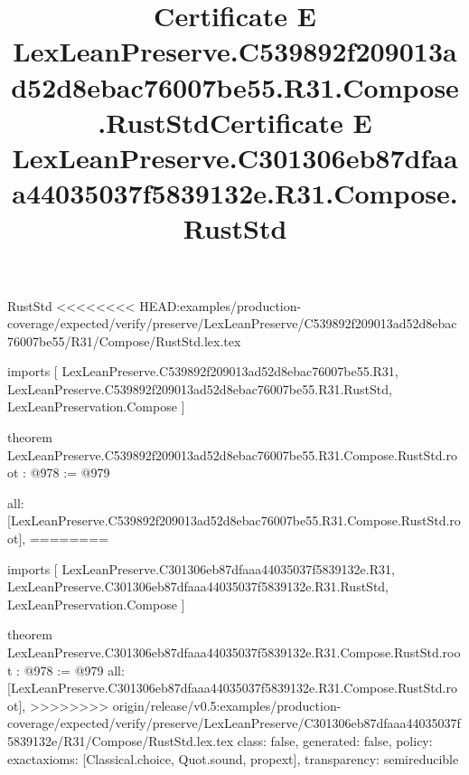 \begin{lexlean}{RustStd}
<<<<<<<< HEAD:examples/production-coverage/expected/verify/preserve/LexLeanPreserve/C539892f209013ad52d8ebac76007be55/R31/Compose/RustStd.lex.tex
\title{Certificate E LexLeanPreserve.C539892f209013ad52d8ebac76007be55.R31.Compose.RustStd}
\begin{coremodule}
imports [
  LexLeanPreserve.C539892f209013ad52d8ebac76007be55.R31,
  LexLeanPreserve.C539892f209013ad52d8ebac76007be55.R31.RustStd,
  LexLeanPreservation.Compose
]

theorem LexLeanPreserve.C539892f209013ad52d8ebac76007be55.R31.Compose.RustStd.root : @978 := @979 {
  all: [LexLeanPreserve.C539892f209013ad52d8ebac76007be55.R31.Compose.RustStd.root],
========
\title{Certificate E LexLeanPreserve.C301306eb87dfaaa44035037f5839132e.R31.Compose.RustStd}
\begin{coremodule}
imports [
  LexLeanPreserve.C301306eb87dfaaa44035037f5839132e.R31,
  LexLeanPreserve.C301306eb87dfaaa44035037f5839132e.R31.RustStd,
  LexLeanPreservation.Compose
]

theorem LexLeanPreserve.C301306eb87dfaaa44035037f5839132e.R31.Compose.RustStd.root : @978 := @979 {
  all: [LexLeanPreserve.C301306eb87dfaaa44035037f5839132e.R31.Compose.RustStd.root],
>>>>>>>> origin/release/v0.5:examples/production-coverage/expected/verify/preserve/LexLeanPreserve/C301306eb87dfaaa44035037f5839132e/R31/Compose/RustStd.lex.tex
  class: false,
  generated: false,
  policy: exact{axioms: [Classical.choice, Quot.sound, propext]},
  transparency: semireducible
}


\end{coremodule}}
\end{coremodule}
\end{lexlean}

